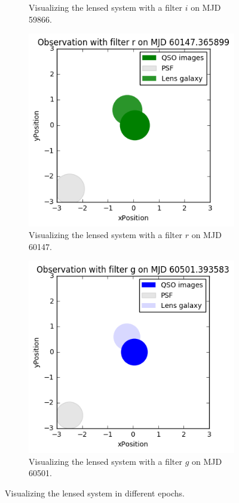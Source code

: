 \documentclass[\docopts]{\docclass}
\begin{document}
\begin{figure}
\begin{subfigure}[b]{0.2\textwidth}
        \caption{Visualizing the lensed system with a filter $i$ on MJD 59866.}
        \label{fig:vis_lens_b}
    \end{subfigure}
    \begin{subfigure}[b]{0.2\textwidth}
        \includegraphics[width=\textwidth]{plot-c.png}
        \caption{Visualizing the lensed system with a filter $r$ on MJD 60147.}
        \label{fig:vis_lens_c}
    \end{subfigure}
    \begin{subfigure}[b]{0.2\textwidth}
        \includegraphics[width=\textwidth]{plot-d.png}
        \caption{Visualizing the lensed system with a filter $g$ on MJD 60501.}
        \label{fig:vis_lens_d}
    \end{subfigure}
    \caption{Visualizing the lensed system in different epochs.}
    \label{fig:visualization}
\end{figure}
\end{document}
